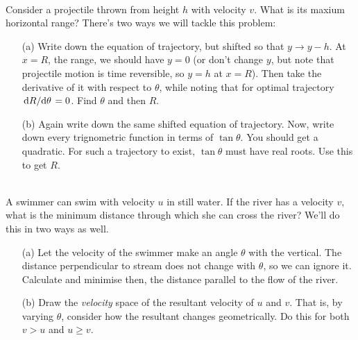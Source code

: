     \begin{exc}
        \begin{exercise}[subtitle={Projectile from a height}, points = 3]
            \smallskip
            ~\\
            Consider a projectile thrown from height $h$ with velocity $v$. What is its maxium horizontal range?
            There's two ways we will tackle this problem:

            \begin{enumerate}
                \item[(a)] Write down the equation of trajectory, but shifted so that $y \to y - h$. At $x = R$, the range,
                 we should have $y = 0$ (or don't change $y$, but note that projectile motion is time reversible, so $y=h$ at 
                 $x = R$). Then take the derivative of it with respect to $\theta$, while noting that for optimal trajectory 
                 $\dv*{R}{\theta} = 0$. Find $\theta$ and then $R$.
                 \item[(b)] Again write down the same shifted equation of trajectory. Now, write down every trignometric function
                 in terms of $\tan\theta$. You should get a quadratic. For such a trajectory to exist, $\tan\theta$ must have 
                 real roots. Use this to get $R$. 
            \end{enumerate}
            \label{exc: wedge-projectile}
        \end{exercise}

        \begin{exercise}[subtitle={River and Drift}, points = 2]
            \smallskip
            ~\\
            A swimmer can swim with velocity $u$ in still water. If the river has a velocity $v$, what is the minimum 
            distance through which she can cross the river? We'll do this in two ways as well.
            \begin{enumerate}
                \item[(a)] Let the velocity of the swimmer make an angle $\theta$ with the vertical. The distance perpendicular 
                to stream does not change with $\theta$, so we can ignore it. Calculate and minimise then, the distance 
                parallel to the flow of the river.
                \item[(b)] Draw the \emph{velocity} space of the resultant velocity of $u$ and $v$. That is, by varying $\theta$,
                consider how the resultant changes geometrically. Do this for both $v > u$ and $u \ge v$. 
            \end{enumerate}
        \end{exercise}


\end{exc}

